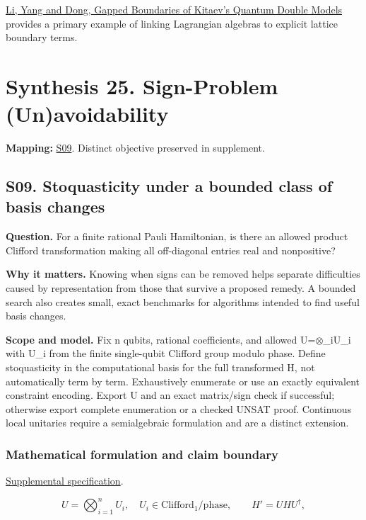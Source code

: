 \documentclass[
  11pt,
]{article}
\begin{document}
\href{https://arxiv.org/abs/2504.19512}{Li, Yang and Dong, Gapped
Boundaries of Kitaev's Quantum Double Models} provides a primary example
of linking Lagrangian algebras to explicit lattice boundary terms.

\section{Synthesis 25. Sign-Problem (Un)avoidability}

\textbf{Mapping:}
\href{https://github.com/rick-stevens-ai/Pure-Thought/blob/main/supplemental/S09.md}{S09}.
Distinct objective preserved in supplement.

\subsection{S09. Stoquasticity under a bounded class of basis changes}

\textbf{Question.} For a finite rational Pauli Hamiltonian, is there an
allowed product Clifford transformation making all off-diagonal entries
real and nonpositive?

\textbf{Why it matters.} Knowing when signs can be removed helps
separate difficulties caused by representation from those that survive a
proposed remedy. A bounded search also creates small, exact benchmarks
for algorithms intended to find useful basis changes.

\textbf{Scope and model.} Fix n qubits, rational coefficients, and
allowed U=\ensuremath{\otimes}\_iU\_i with U\_i from the finite
single-qubit Clifford group modulo phase. Define stoquasticity in the
computational basis for the full transformed H, not automatically term
by term. Exhaustively enumerate or use an exactly equivalent constraint
encoding. Export U and an exact matrix/sign check if successful;
otherwise export complete enumeration or a checked UNSAT proof.
Continuous local unitaries require a semialgebraic formulation and are a
distinct extension.

\subsubsection{Mathematical formulation and claim boundary}

\href{https://github.com/rick-stevens-ai/Pure-Thought/blob/main/supplemental/S09.md}{Supplemental
specification}.

\[U=\bigotimes_{i=1}^nU_i,\quad U_i\in\mathrm{Clifford}_1/\mathrm{phase},
\qquad H'=UHU^\dagger,\]
\end{document}
